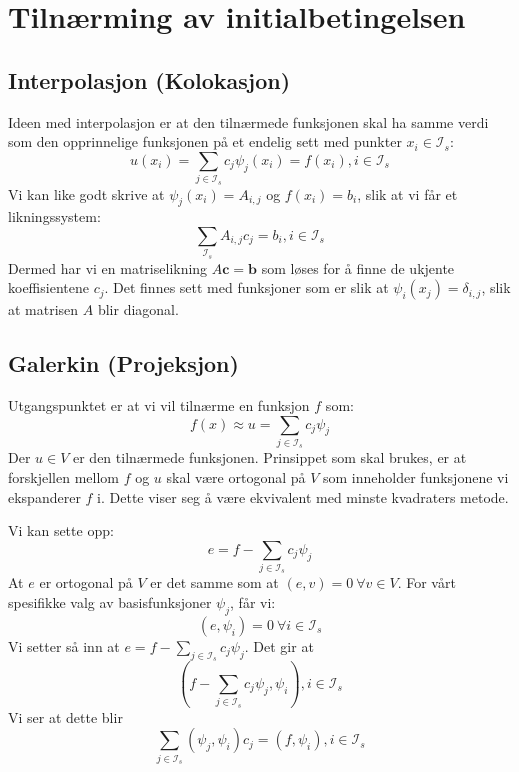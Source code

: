 \documentclass[a4paper, 10pt]{article}
\newcommand{\mb}{\mathbf}
\newcommand{\mc}{\mathcal}
\begin{document}
\section{Tilnærming av initialbetingelsen}
\subsection{Interpolasjon (Kolokasjon)}
Ideen med interpolasjon er at den tilnærmede funksjonen skal ha samme verdi som den opprinnelige funksjonen på et endelig sett med punkter $x_i \in \mc{I}_s$:
\begin{equation}
	u(x_i) = \sum_{j\in \mc{I}_s}c_j \psi_j(x_i) = f(x_i), i\in \mc{I}_s
\end{equation}
Vi kan like godt skrive at $\psi_j(x_i) = A_{i,j}$ og $f(x_i) = b_i$, slik at vi får et likningssystem:
\begin{equation}
	\sum_{\mc{I}_s} A_{i,j}c_j = b_i, i\in \mc{I}_s
\end{equation}
Dermed har vi en matriselikning $A\mb{c} = \mb{b}$ som løses for å finne de ukjente koeffisientene $c_j$.
Det finnes sett med funksjoner som er slik at $\psi_i(x_j) = \delta_{i,j}$, slik at matrisen $A$ blir diagonal. 

\subsection{Galerkin (Projeksjon)}
Utgangspunktet er at vi vil tilnærme en funksjon $f$ som:
\begin{equation}
	f(x) \approx u = \sum_{j\in \mc{I}_s} c_j \psi_j
\end{equation}
Der $u \in V$ er den tilnærmede funksjonen.
Prinsippet som skal brukes, er at forskjellen mellom $f$ og $u$ skal være ortogonal på $V$ som inneholder funksjonene vi ekspanderer $f$ i. Dette viser seg å være ekvivalent med minste kvadraters metode. 

Vi kan sette opp: 
\begin{equation}
	e = f - \sum_{j\in \mc{I}_s} c_j \psi_j
\end{equation}
At $e$ er ortogonal på $V$ er det samme som at $(e, v) = 0 \  \forall v \in V$. For vårt spesifikke valg av basisfunksjoner $\psi_j$, får vi:
\begin{equation}
	(e, \psi_i) = 0 \ \forall i \in \mc{I}_s
\end{equation}
Vi setter så inn at $e = f - \sum_{j\in \mc{I}_s} c_j \psi_j$. Det gir at
\begin{equation}
	(f - \sum_{j\in \mc{I}_s} c_j \psi_j, \psi_i), i \in \mc{I}_s
\end{equation}
Vi ser at dette blir 
\begin{equation}
	\sum_{j \in \mc{I}_s} (\psi_j, \psi_i)c_j = (f, \psi_i), i\in \mc{I}_s
\end{equation}
\end{document}
